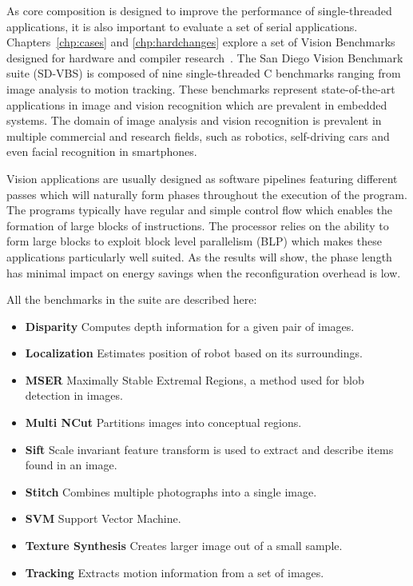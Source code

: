 As core composition is designed to improve the performance of single-threaded applications, it is also important to evaluate a set of serial applications.
Chapters~\ref{chp:cases} and \ref{chp:hardchanges} explore a set of Vision Benchmarks designed for hardware and compiler research~\cite{sdvbs}.
The San Diego Vision Benchmark suite (SD-VBS) is composed of nine single-threaded C benchmarks ranging from image analysis to motion tracking.
These benchmarks represent state-of-the-art applications in image and vision recognition which are prevalent in embedded systems.
The domain of image analysis and vision recognition is prevalent in multiple commercial and research fields, such as robotics, self-driving cars and even facial recognition in smartphones.

Vision applications are usually designed as software pipelines featuring different passes which will naturally form phases throughout the execution of the program.
The programs typically have regular and simple control flow which enables the formation of large blocks of instructions.
The processor relies on the ability to form large blocks to exploit block level parallelism (BLP) which makes these applications particularly well suited.
As the results will show, the phase length has minimal impact on energy savings when the reconfiguration overhead is low.

All the benchmarks in the suite are described here:
\begin{itemize}
\item \textbf{Disparity} Computes depth information for a given pair of images.
\vspace{-1em}
\item \textbf{Localization} Estimates position of robot based on its surroundings.
\vspace{-1em}
\item \textbf{MSER} Maximally Stable Extremal Regions, a method used for blob detection in images.
\vspace{-1em}
\item \textbf{Multi NCut} Partitions images into conceptual regions.
\vspace{-1em}
\item \textbf{Sift} Scale invariant feature transform is used to extract and describe items found in an image.
\vspace{-1em}
\item \textbf{Stitch} Combines multiple photographs into a single image.
\vspace{-1em}
\item \textbf{SVM} Support Vector Machine.
\vspace{-1em}
\item \textbf{Texture Synthesis} Creates larger image out of a small sample.
\vspace{-1em}
\item \textbf{Tracking} Extracts motion information from a set of images.
\end{itemize}

